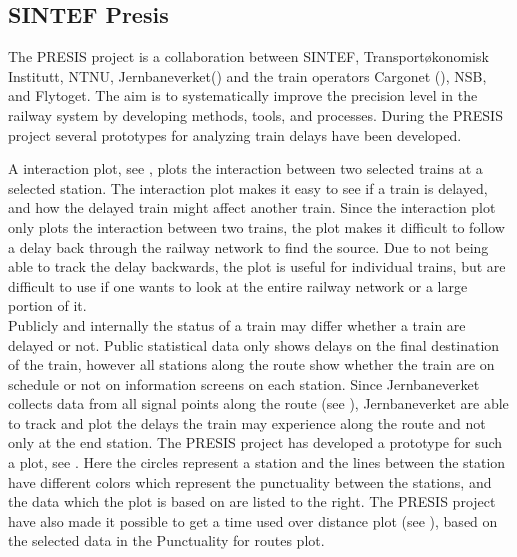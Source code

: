 \subsection{SINTEF Presis}
\label{sub:subsection_sintefPresis}

The PRESIS\cite{sintefPresis} project is a collaboration between SINTEF\cite{sintef},
Transportøkonomisk Institutt\cite{transportOkonomiskInstitutt},
NTNU\cite{ntnu}, Jernbaneverket() 
and the train operators Cargonet (), NSB\cite{nsbForside}, and Flytoget\cite{flytoget}. The aim is to systematically improve the precision 
level in the railway system by developing methods, tools, and processes. During
the PRESIS project several prototypes for analyzing train delays have been 
developed.

A interaction plot, see , plots the interaction
between two selected trains at a selected station. The interaction plot makes 
it easy to see if a train is delayed, and how the delayed train might affect 
another train. Since the interaction plot only plots the interaction between 
two trains, the plot makes it difficult to follow a delay back through the 
railway network to find the source. Due to not being able to track the delay
backwards, the plot is useful for individual trains, but are difficult to use
if one wants to look at the entire railway network or a large portion of it. \\

Publicly and internally the status of a train may differ whether a train are 
delayed or not. Public statistical data only shows delays on the final 
destination of the train, however all stations along the route show whether 
the train are on schedule or not on information screens on each station. Since 
Jernbaneverket collects data from all signal points along the route (see 
), Jernbaneverket are able to track and 
plot the delays the train may experience along the route and not only at the 
end station. The PRESIS project has developed a prototype for such a plot, see 
. Here the circles represent a station and the lines 
between the station have different colors which represent the punctuality 
between the stations, and the data which the plot is based on are listed to 
the right. The PRESIS project have also made it possible to get a time used 
over distance plot (see ), based on the 
selected data in the Punctuality for routes plot. 


